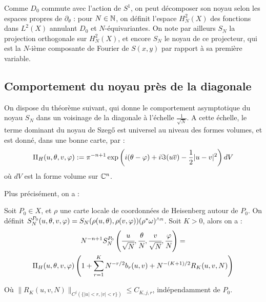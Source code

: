 Comme $D_0$ commute avec l'action de $S^1$, on peut décomposer son noyau selon les espaces propres de $\partial_{\theta}$ : pour $N \in \mathbb{N}$, on définit l'espace $H^2_N(X)$ des fonctions dans $L^2(X)$ annulant $D_0$ et $N$-équivariantes. On note par ailleurs  $S_N$ la projection orthogonale sur $H^2_N(X)$, et encore $S_N$ le noyau de ce projecteur, qui est la $N$-ième composante de Fourier de $S(x,y)$ par rapport à sa première variable.

\subsection{Comportement du noyau près de la diagonale}
On dispose du théorème suivant, qui donne le comportement asymptotique du noyau $S_N$ dans un voisinage de la diagonale à l'échelle $\frac{1}{\sqrt{N}}$. A cette échelle, le terme dominant du noyau de Szeg\H{o} est universel au niveau des formes volumes, et est donné, dans une bonne carte, par :
\begin{equation*}
	\Pi_H(u,\theta,v,\varphi) := \pi^{-n+1}\exp\left(i(\theta-\varphi)+i\Im(u\overline{v}) - \frac12 |u-v|^2\right) dV
\end{equation*}
où $dV$ est la forme volume sur $\mathbb{C}^n$.

Plus précisément, on a :
\begin{theorem}\label{thm:SZ}
	Soit $P_0 \in X$, et $\rho$ une carte locale de coordonnées de Heisenberg autour de $P_0$. On définit $S_N^{P_0}(u,\theta,v,\varphi) = S_N(\rho(u,\theta), \rho(v,\varphi)) (\rho^*\omega)^{\wedge n}$. Soit $K>0$, alors on a :
	\begin{multline*}
	N^{-n+1}S_N^{P_0}\left(\cfrac{u}{\sqrt{N}},\cfrac{\theta}{N}, \cfrac{v}{\sqrt{N}}, \cfrac{\varphi}{N}\right)= \\\Pi_H(u,\theta,v,\varphi)\left(1+\sum_{r=1}^K N^{-r/2}b_r(u,v) + N^{-(K+1)/2}R_K(u,v,N)\right)
	\end{multline*}
	
	Où $\|R_K(u,v,N)\|_{C^j(\{|u| < r, |v| < r\})} \leq C_{K,j,r}$, indépendamment de $P_0$.
\end{theorem}

